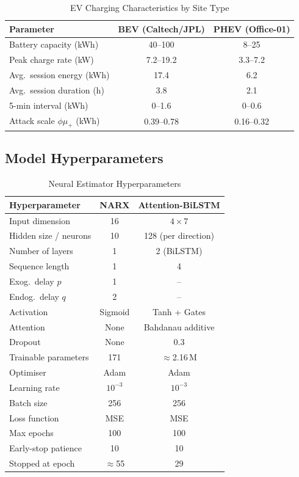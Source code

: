 \documentclass[journal]{IEEEtran}
\begin{document}
\begin{table}[!t]
\caption{EV Charging Characteristics by Site Type}
\label{tab:evtypes}
\centering
\begin{tabular}{|l|c|c|}
\hline
\textbf{Parameter} & \textbf{BEV (Caltech/JPL)} & \textbf{PHEV (Office-01)} \\
\hline
Battery capacity (kWh)      & 40--100     & 8--25 \\
Peak charge rate (kW)       & 7.2--19.2   & 3.3--7.2 \\
Avg.\ session energy (kWh)  & 17.4        & 6.2     \\
Avg.\ session duration (h)  & 3.8         & 2.1     \\
5-min interval (kWh)        & 0--1.6      & 0--0.6  \\
Attack scale $\phi\mu_+$ (kWh) & 0.39--0.78 & 0.16--0.32 \\
\hline
\end{tabular}
\end{table}

\subsection{Model Hyperparameters}

\begin{table}[!t]
\caption{Neural Estimator Hyperparameters}
\label{tab:hyperparams}
\centering
\begin{tabular}{|p{3.0cm}|c|c|}
\hline
\textbf{Hyperparameter} & \textbf{NARX} & \textbf{Attention-BiLSTM} \\
\hline
Input dimension         & 16            & $4\times7$ \\
Hidden size / neurons   & 10            & 128 (per direction) \\
Number of layers        & 1             & 2 (BiLSTM) \\
Sequence length         & 1             & 4 \\
Exog.\ delay $p$        & 1             & -- \\
Endog.\ delay $q$       & 2             & -- \\
Activation              & Sigmoid       & Tanh + Gates \\
Attention               & None          & Bahdanau additive \\
Dropout                 & None          & 0.3 \\
Trainable parameters    & 171           & $\approx$2.16\,M \\
Optimiser               & Adam          & Adam \\
Learning rate           & $10^{-3}$     & $10^{-3}$ \\
Batch size              & 256           & 256 \\
Loss function           & MSE           & MSE \\
Max epochs              & 100           & 100 \\
Early-stop patience     & 10            & 10 \\
Stopped at epoch        & $\approx$55   & 29 \\
\hline
\end{tabular}
\end{table}
\end{document}
